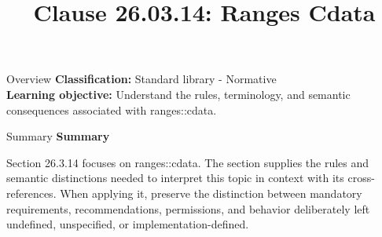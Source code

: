 \documentclass[10pt,letterpaper]{article}
\title{Clause 26.03.14: Ranges Cdata}
\author{}
\date{}
\begin{document}
\maketitle
\begin{CornellOverviewBox}{Overview}
\textbf{Classification:} Standard library - Normative\\[2pt]
\textbf{Learning objective:} Understand the rules, terminology, and semantic consequences associated with ranges::cdata.
\end{CornellOverviewBox}\begin{CornellSummaryBox}{Summary}
{\sffamily\bfseries\color{Accent} Summary}\par\vspace{3pt}Section 26.3.14 focuses on ranges::cdata. The section supplies the rules and semantic distinctions needed to interpret this topic in context with its cross-references. When applying it, preserve the distinction between mandatory requirements, recommendations, permissions, and behavior deliberately left undefined, unspecified, or implementation-defined.
\end{CornellSummaryBox}
\end{document}
